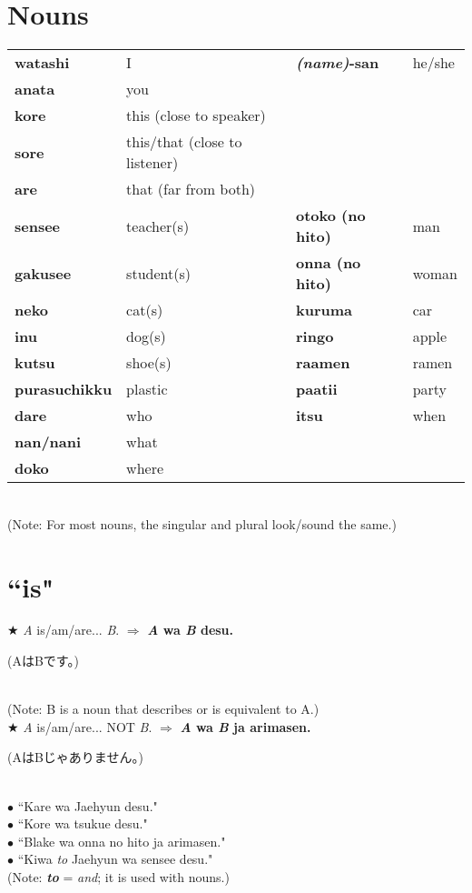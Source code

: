 \documentclass[11pt]{article} %
\newcommand{\ee}{\vspace{.10cm}\\} %
\begin{document}
\section{Nouns}
\begin{tabular}{l | l || l | l}
\textbf{watashi} & I						& \textbf{\textit{(name)}-san} & he/she\\
\textbf{anata} & you\\
\hline
\textbf{kore} & this (close to speaker)\\
\textbf{sore} & this/that (close to listener)\\
\textbf{are} & that (far from both)\\
\hline
\textbf{sensee} & teacher(s)				& \textbf{otoko (no hito)} & man\\
\textbf{gakusee} & student(s)				& \textbf{onna (no hito)}  & woman\\
\textbf{neko} & cat(s)						& \textbf{kuruma}		   & car\\
\textbf{inu} & dog(s)						& \textbf{ringo}		   & apple\\
\textbf{kutsu} & shoe(s)					& \textbf{raamen}		   & ramen\\
\textbf{purasuchikku} & plastic				& \textbf{paatii}		   & party\\
\hline
\textbf{dare} & who							& \textbf{itsu}				& when\\
\textbf{nan/nani} & what\\
\textbf{doko} & where\\
\end{tabular}\\
(Note: For most nouns, the singular and plural look/sound the same.)


\section{``is"}
$\bigstar$ \textit{A} is/am/are... \textit{B}. $\Rightarrow$ \textbf{\textit{A} wa \textit{B} desu.}
\begin{CJK}{UTF8}{min}(AはBです。)\end{CJK}\\
(Note: B is a noun that describes or is equivalent to A.)\ee

$\bigstar$ \textit{A} is/am/are... NOT \textit{B}. $\Rightarrow$ \textbf{\textit{A} wa \textit{B} ja arimasen.}
\begin{CJK}{UTF8}{min}(AはBじゃありません。)\end{CJK}\ee

$\bullet$ ``Kare wa Jaehyun desu."\\
$\bullet$ ``Kore wa tsukue desu."\\
$\bullet$ ``Blake wa onna no hito ja arimasen."\\
$\bullet$ ``Kiwa \textit{to} Jaehyun wa sensee desu."\\
(Note: \textbf{\textit{to}} = \textit{and}; it is used with nouns.)
\end{document}
